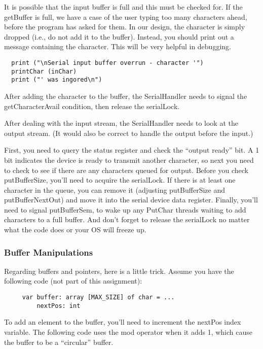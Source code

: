 \documentclass[11pt]{article}
\begin{document}
It is possible that the input buffer is full and this must be checked
for.  If the getBuffer is full, we have a case of the user typing too
many characters ahead, before the program has asked for them.  In our
design, the character is simply dropped (i.e., do not add it to the
buffer).  Instead, you should print out a message containing the
character.  This will be very helpful in debugging.

\begin{verbatim}
  print ("\nSerial input buffer overrun - character '")
  printChar (inChar)
  print ("' was ingored\n")
\end{verbatim}

After adding the character to the buffer, the SerialHandler needs to
signal the getCharacterAvail condition, then release the serialLock.

After dealing with the input stream, the SerialHandler needs to look
at the output stream.  (It would also be correct to handle the output
before the input.)

First, you need to query the status register and check the ``output
ready'' bit.  A 1 bit indicates the device is ready to transmit another
character, so next you need to check to see if there are any
characters queued for output.  Before you check putBufferSize, you'll
need to acquire the serialLock.  If there is at least one character in
the queue, you can remove it (adjusting putBufferSize and
putBufferNextOut) and move it into the serial device data register.
Finally, you'll need to signal putBufferSem, to wake up any PutChar
threads waiting to add characters to a full buffer.  And don't forget
to release the serialLock no matter what the code does or your OS will
freeze up.

\subsubsection{Buffer Manipulations}

Regarding buffers and pointers, here is a little trick.  Assume you
have the following code (not part of this assignment):

\begin{verbatim}
     var buffer: array [MAX_SIZE] of char = ...
         nextPos: int
\end{verbatim}

To add an element to the buffer, you'll need to increment the nextPos
index variable.  The following code uses the mod operator when it adds
1, which cause the buffer to be a ``circular'' buffer.
\end{document}
